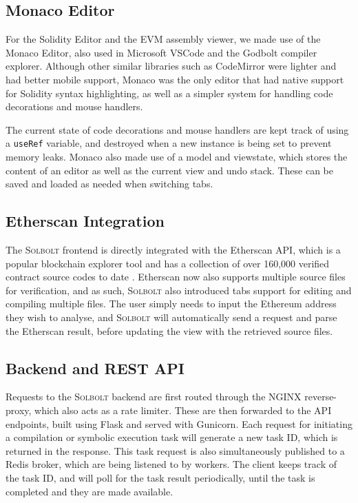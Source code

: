 \subsection{Monaco Editor}

For the Solidity Editor and the EVM assembly viewer, we made use of the Monaco Editor,
also used in Microsoft VSCode and the Godbolt compiler explorer.
Although other similar libraries such as CodeMirror were lighter and had better mobile
support, Monaco was the only editor that had native support for Solidity syntax highlighting, 
as well as a simpler system for handling code decorations and mouse handlers. 

The current state 
of code decorations and mouse handlers are kept track of using a \texttt{useRef} variable,
and destroyed when a new instance is being set to prevent memory leaks.
Monaco also made use of a 
model and viewstate, which stores the content of an editor as well as the current view and undo
stack. These can be saved and loaded as needed when switching tabs.

\subsection{Etherscan Integration}

The \textcolor{NavyBlue}{\textsc{Solbolt}} frontend is directly integrated with the Etherscan API, which is a popular blockchain
explorer tool and has a collection of over 160,000
verified contract source codes to date \cite{smart_contract_sanctuary}. Etherscan now also 
supports multiple source files for verification, and as such, \textcolor{NavyBlue}{\textsc{Solbolt}} also introduced tabs support
for editing and compiling multiple files. The user simply needs to input the Ethereum address they
wish to analyse, and \textcolor{NavyBlue}{\textsc{Solbolt}} will automatically send a request and parse the Etherscan result, before
updating the view with the retrieved source files.

\subsection{Backend and REST API}
Requests to the \textcolor{NavyBlue}{\textsc{Solbolt}} backend are first routed through the NGINX reverse-proxy, which also
acts as a rate limiter. These are then forwarded to the API endpoints, built using Flask and
served with Gunicorn. Each request for initiating a compilation or symbolic execution task will generate a
new task ID, which is returned in the response. This task request is also simultaneously
published to a Redis broker, which are being listened to by workers. The client keeps track
of the task ID, and will poll for the task result periodically, until the task is completed
and they are made available.


